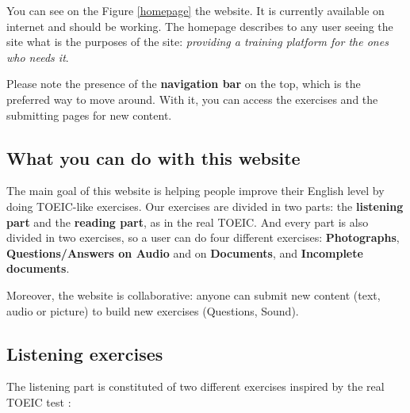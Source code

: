 \documentclass[12pt,a4paper]{report}
\begin{document}
You can see on the Figure \ref{homepage} the website. It is currently available on
internet and should be working. The homepage describes to any user seeing the site what is the purposes of the site: \textit{providing a training platform for the ones who needs it}.

Please note the presence of the \textbf{navigation bar} on the top, which is the preferred way to move around. With it, you can access the exercises and the submitting pages for new content.


\subsection{What you can do with this website}

The main goal of this website is helping people improve their
English level by doing TOEIC-like exercises. Our exercises are
divided in two parts: the \textbf{listening part} and the
\textbf{reading part}, as in the real TOEIC. And every part
is also divided in two exercises, so a user can do four different
exercises: \textbf{Photographs}, \textbf{Questions/Answers on Audio} and
on \textbf{Documents}, and \textbf{Incomplete documents}.

Moreover, the website is collaborative: anyone can submit new content (text, audio or picture) to build new exercises (Questions, Sound).

\subsection{Listening exercises}

The listening part is constituted of two different exercises inspired by the real TOEIC test :
\end{document}
